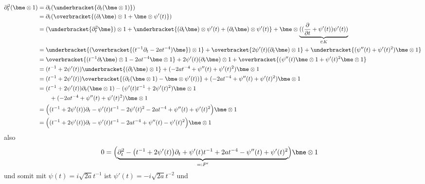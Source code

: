 \begin{align*}
\partial_t^2(\bme\otimes 1) 
  &=\partial_t(\underbracket{\partial_t(\bme\otimes 1)})\\
  &= \partial_t(\overbracket{(\partial_t\bme)\otimes 1
    + \bme\otimes \psi'(t)})\\
  &= (\underbracket{\partial_t^2 \bme})\otimes 1
    + \underbracket{(\partial_t \bme)\otimes \psi'(t)
    +               (\partial_t \bme)\otimes \psi'(t)}
    + \bme\otimes\underset{\in K}{\underbrace{((\frac{\partial}{\partial t}
    + \psi'(t))\psi'(t))}}\\
  &= \underbracket{(\overbracket{(t^{-1}\partial_t - 2at^{-4}) \bme})\otimes 1}
    + \overbracket{2\psi'(t) (\partial_t \bme)\otimes 1}
    + \underbracket{(\psi''(t) + \psi'(t)^2)\bme\otimes 1}\\
  &= \overbracket{
      (t^{-1}\partial_t \bme)\otimes 1
      - 2at^{-4} \bme\otimes 1
    }
    + 2\psi'(t) (\partial_t \bme)\otimes 1 + \overbracket{
      ( \psi''(t) \bme\otimes 1
      + \psi'(t)^2 \bme\otimes 1
    }\\
  &= (t^{-1} + 2\psi'(t)) \underbracket{(\partial_t \bme)\otimes 1}
    + (- 2at^{-4} + \psi''(t) + \psi'(t)^2) \bme\otimes 1 \\
  &= (t^{-1} + 2\psi'(t))\overbracket{(\partial_t (\bme\otimes 1)
    - \bme\otimes \psi'(t))}+ (- 2at^{-4} + \psi''(t) + \psi'(t)^2) 
    \bme\otimes 1 \\
  &\begin{aligned}
    &= (t^{-1} + 2\psi'(t))\partial_t (\bme\otimes 1)
    - (\psi'(t) t^{-1} + 2\psi'(t)^2)\bme\otimes 1\\
    &\qquad + (- 2at^{-4} + \psi''(t) + \psi'(t)^2) \bme\otimes 1 \\
  \end{aligned} \\
  &= \Big((t^{-1} + 2\psi'(t))\partial_t
    - \psi'(t) t^{-1} - 2\psi'(t)^2 - 2at^{-4} + \psi''(t)
    + \psi'(t)^2\Big) \bme\otimes 1 \\
  &= \Big((t^{-1} + 2\psi'(t))\partial_t
    - \psi'(t) t^{-1} - 2at^{-4} + \psi''(t)
    - \psi'(t)^2\Big) \bme\otimes 1\\
\end{align*}
also
\begin{align*}
0 &= \Big( \underset{=:P'}{\underbrace{
    \partial_t^2 - \big(t^{-1} + 2\psi'(t)\big)\partial_t
    + \psi'(t) t^{-1} + 2at^{-4} -\psi''(t)
    + \psi'(t)^2 }} \Big) \bme\otimes 1
\end{align*}
und somit mit $\psi(t)=i\sqrt{2a}t^{-1}$ ist $\psi'(t)=-i\sqrt{2a}t^{-2}$ und
